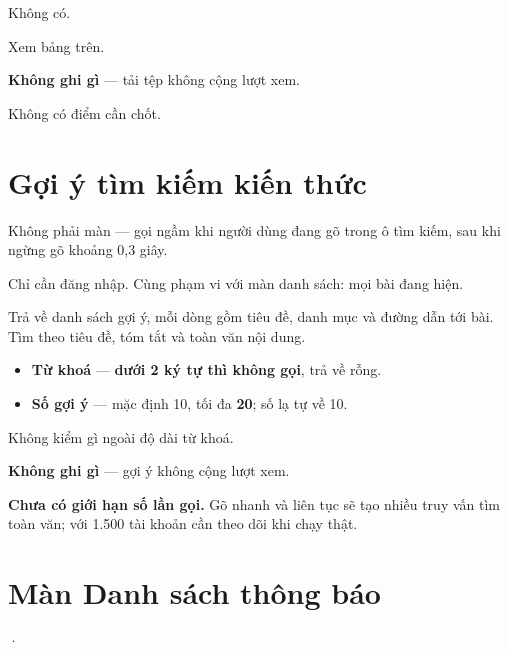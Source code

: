 Không có.


Xem bảng trên.

\mghi

\textbf{Không ghi gì} --- tải tệp không cộng lượt xem.

\mhoi

\begin{ask}
Không có điểm cần chốt.
\end{ask}

\section{Gợi ý tìm kiếm kiến thức}
\medskip

\mvao

Không phải màn --- gọi ngầm khi người dùng đang gõ trong ô tìm kiếm, sau khi ngừng gõ khoảng
0,3 giây.

\mai

Chỉ cần đăng nhập. Cùng phạm vi với màn danh sách: mọi bài đang hiện.

\mhien

Trả về danh sách gợi ý, mỗi dòng gồm tiêu đề, danh mục và đường dẫn tới bài. Tìm theo tiêu đề,
tóm tắt và toàn văn nội dung.

\mloc

\begin{itemize}[leftmargin=*]
  \item \textbf{Từ khoá} --- \textbf{dưới 2 ký tự thì không gọi}, trả về rỗng.
  \item \textbf{Số gợi ý} --- mặc định 10, tối đa \textbf{20}; số lạ tự về 10.
\end{itemize}


Không kiểm gì ngoài độ dài từ khoá.

\mghi

\textbf{Không ghi gì} --- gợi ý không cộng lượt xem.

\mhoi

\begin{ask}
\textbf{Chưa có giới hạn số lần gọi.} Gõ nhanh và liên tục sẽ tạo nhiều truy vấn tìm toàn văn;
với 1.500 tài khoản cần theo dõi khi chạy thật.
\end{ask}

\section{Màn Danh sách thông báo}
 · 
\medskip

